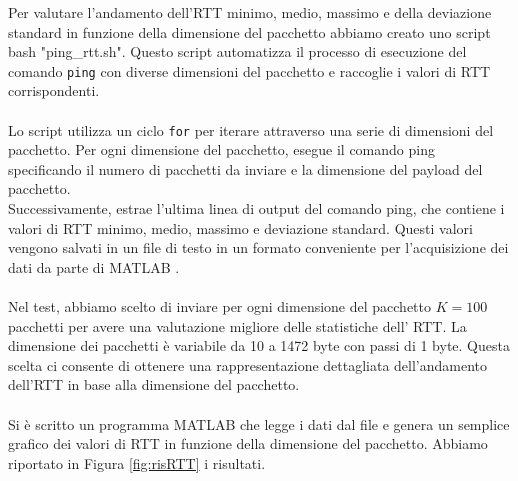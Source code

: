 Per valutare l'andamento dell'RTT minimo, medio, massimo e della deviazione standard in funzione della dimensione del pacchetto abbiamo creato uno script bash "ping\_rtt.sh". Questo script automatizza il processo di esecuzione del comando \texttt{ping} con diverse dimensioni del pacchetto e raccoglie i valori di RTT corrispondenti.\\\\
Lo script utilizza un ciclo \texttt{for} per iterare attraverso una serie di dimensioni del pacchetto. Per ogni dimensione del pacchetto, esegue il comando ping specificando il numero di pacchetti da inviare e la dimensione del payload del pacchetto.\\ Successivamente, estrae l'ultima linea di output del comando ping, che contiene i valori di RTT minimo, medio, massimo e deviazione standard. Questi valori vengono salvati in un file di testo in un formato conveniente per l'acquisizione dei dati da parte di MATLAB \Rcerchio.\\\\
Nel test, abbiamo scelto di inviare per ogni dimensione del pacchetto $K=100$ pacchetti per avere una valutazione migliore delle statistiche dell' RTT. La dimensione dei pacchetti è variabile da 10 a 1472 byte con passi di 1 byte. Questa scelta ci consente di ottenere una rappresentazione dettagliata dell'andamento dell'RTT in base alla dimensione del pacchetto.\\\\
Si è scritto un programma MATLAB \Rcerchio che legge i dati dal file e genera un semplice grafico dei valori di RTT in funzione della dimensione del pacchetto. Abbiamo riportato in Figura \ref{fig:risRTT} i risultati.
